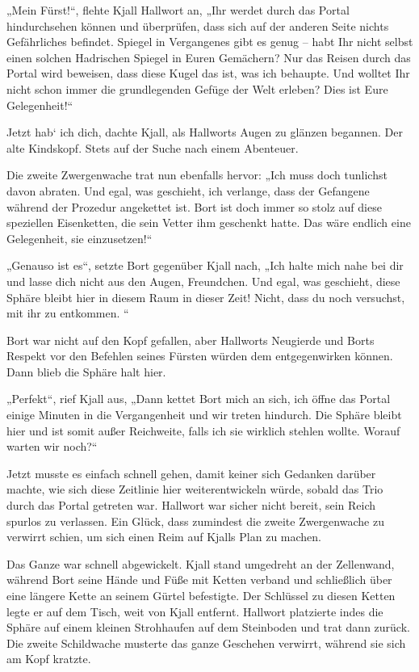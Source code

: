 \documentclass[10pt, a4paper, oneside]{book}
\begin{document}
„Mein Fürst!“, flehte Kjall Hallwort an, „Ihr werdet durch das Portal hindurchsehen können und überprüfen, dass sich auf der anderen Seite nichts Gefährliches befindet. Spiegel in Vergangenes gibt es genug – habt Ihr nicht selbst einen solchen Hadrischen Spiegel in Euren Gemächern? Nur das Reisen durch das Portal wird beweisen, dass diese Kugel das ist, was ich behaupte. Und wolltet Ihr nicht schon immer die grundlegenden Gefüge der Welt erleben? Dies ist Eure Gelegenheit!“

Jetzt hab‘ ich dich, dachte Kjall, als Hallworts Augen zu glänzen begannen. Der alte Kindskopf. Stets auf der Suche nach einem Abenteuer.

Die zweite Zwergenwache trat nun ebenfalls hervor: „Ich muss doch tunlichst davon abraten. Und egal, was geschieht, ich verlange, dass der Gefangene während der Prozedur angekettet ist. Bort ist doch immer so stolz auf diese speziellen Eisenketten, die sein Vetter ihm geschenkt hatte. Das wäre endlich eine Gelegenheit, sie einzusetzen!“

„Genauso ist es“, setzte Bort gegenüber Kjall nach, „Ich halte mich nahe bei dir und lasse dich nicht aus den Augen, Freundchen. Und egal, was geschieht, diese Sphäre bleibt hier in diesem Raum in dieser Zeit! Nicht, dass du noch versuchst, mit ihr zu entkommen. “

Bort war nicht auf den Kopf gefallen, aber Hallworts Neugierde und Borts Respekt vor den Befehlen seines Fürsten würden dem entgegenwirken können. Dann blieb die Sphäre halt hier.

„Perfekt“, rief Kjall aus, „Dann kettet Bort mich an sich, ich öffne das Portal einige Minuten in die Vergangenheit und wir treten hindurch. Die Sphäre bleibt hier und ist somit außer Reichweite, falls ich sie wirklich stehlen wollte. Worauf warten wir noch?“

Jetzt musste es einfach schnell gehen, damit keiner sich Gedanken darüber machte, wie sich diese Zeitlinie hier weiterentwickeln würde, sobald das Trio durch das Portal getreten war. Hallwort war sicher nicht bereit, sein Reich spurlos zu verlassen. Ein Glück, dass zumindest die zweite Zwergenwache zu verwirrt schien, um sich einen Reim auf Kjalls Plan zu machen.\bigskip



Das Ganze war schnell abgewickelt. Kjall stand umgedreht an der Zellenwand, während Bort seine Hände und Füße mit Ketten verband und schließlich über eine längere Kette an seinem Gürtel befestigte. Der Schlüssel zu diesen Ketten legte er auf dem Tisch, weit von Kjall entfernt. Hallwort platzierte indes die Sphäre auf einem kleinen Strohhaufen auf dem Steinboden und trat dann zurück. Die zweite Schildwache musterte das ganze Geschehen verwirrt, während sie sich am Kopf kratzte.
\end{document}

